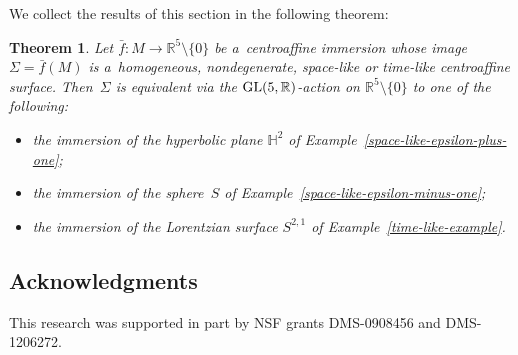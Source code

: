 \documentclass[pdftex]{sigma}
\numberwithin{equation}{section}
\newtheorem{teo}{Theorem}[section]
\theoremstyle{definition}
\begin{document}
We collect the results of this section in the following theorem:

\begin{teo}
\label{homog-thm}
Let $\bar{f}:M \to \mathbb{R}^5 \setminus\{0\}$ be a~centroaffine immersion whose image $\Sigma = \bar{f}(M)$ is
a~homogeneous, nondegenerate, space-like or time-like centroaffine surface.
Then~$\Sigma$ is equivalent via the ${\rm GL}(5,\mathbb{R})$-action on $\mathbb{R}^5 \setminus \{0 \}$ to one of the
following:
\begin{itemize}\itemsep=0pt
\item the immersion of the hyperbolic plane $\mathbb{H}^2$ of Example~{\rm \ref{space-like-epsilon-plus-one}};
\item the immersion of the sphere~$S$ of Example~{\rm \ref{space-like-epsilon-minus-one}};
\item the immersion of the Lorentzian surface $S^{2,1}$ of Example~{\rm \ref{time-like-example}}.
\end{itemize}
\end{teo}

\subsection*{Acknowledgments}
This research was supported in part by NSF grants DMS-0908456 and DMS-1206272.
\end{document}
